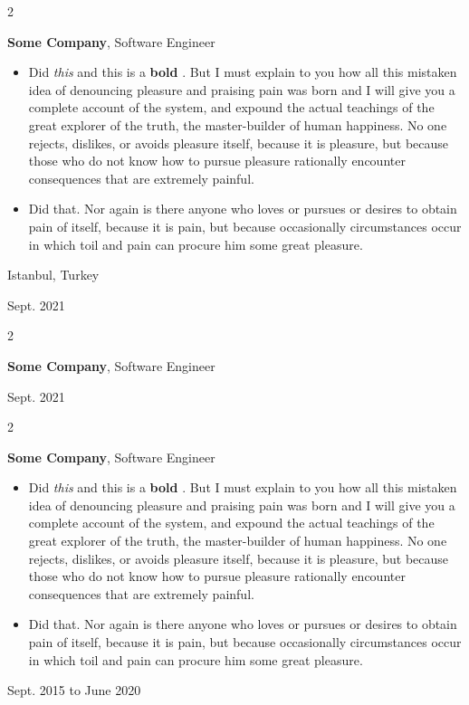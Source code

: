 \documentclass[10pt, letterpaper]{article}
\newenvironment{highlights}{
    \begin{itemize}[
        topsep=0.10 cm,
        parsep=0.10 cm,
        partopsep=0pt,
        itemsep=0pt,
        leftmargin=0.4 cm + 10pt
    ]
}{
    \end{itemize}
} %
\newenvironment{twocolentry}[2][]{
    \onecolentry
    \def\secondColumn{#2}
    \setcolumnwidth{\fill, 4.5 cm}
    \begin{paracol}{2}
}{
    \switchcolumn \raggedleft \secondColumn
    \end{paracol}
    \endonecolentry
} %
\let\hrefWithoutArrow\href
\renewcommand{\href}[2]{\hrefWithoutArrow{#1}{\mbox{\ifthenelse{\equal{#2}{}}{ }{#2 }\raisebox{.15ex}{\footnotesize \faExternalLink*}}}}
\begin{document}
        \vspace{0.2 cm}

        \begin{twocolentry}{
            Istanbul, Turkey

        Sept. 2021
        }
            \textbf{Some \textnormal{Company}}, Software Engineer
            \begin{highlights}
                \item Did \textit{this} and this is a \textbf{bold} \href{https://example.com}{link}. But I must explain to you how all this mistaken idea of denouncing pleasure and praising pain was born and I will give you a complete account of the system, and expound the actual teachings of the great explorer of the truth, the master-builder of human happiness. No one rejects, dislikes, or avoids pleasure itself, because it is pleasure, but because those who do not know how to pursue pleasure rationally encounter consequences that are extremely painful.
                \item Did that. Nor again is there anyone who loves or pursues or desires to obtain pain of itself, because it is pain, but because occasionally circumstances occur in which toil and pain can procure him some great pleasure.
            \end{highlights}
        \end{twocolentry}


        \vspace{0.2 cm}

        \begin{twocolentry}{
            Sept. 2021
        }
            \textbf{Some \textnormal{Company}}, Software Engineer
        \end{twocolentry}


        \vspace{0.2 cm}

        \begin{twocolentry}{
            Sept. 2015 to June 2020
        }
            \textbf{Some \textnormal{Company}}, Software Engineer
            \begin{highlights}
                \item Did \textit{this} and this is a \textbf{bold} \href{https://example.com}{link}. But I must explain to you how all this mistaken idea of denouncing pleasure and praising pain was born and I will give you a complete account of the system, and expound the actual teachings of the great explorer of the truth, the master-builder of human happiness. No one rejects, dislikes, or avoids pleasure itself, because it is pleasure, but because those who do not know how to pursue pleasure rationally encounter consequences that are extremely painful.
                \item Did that. Nor again is there anyone who loves or pursues or desires to obtain pain of itself, because it is pain, but because occasionally circumstances occur in which toil and pain can procure him some great pleasure.
            \end{highlights}
        \end{twocolentry}
\end{document}
